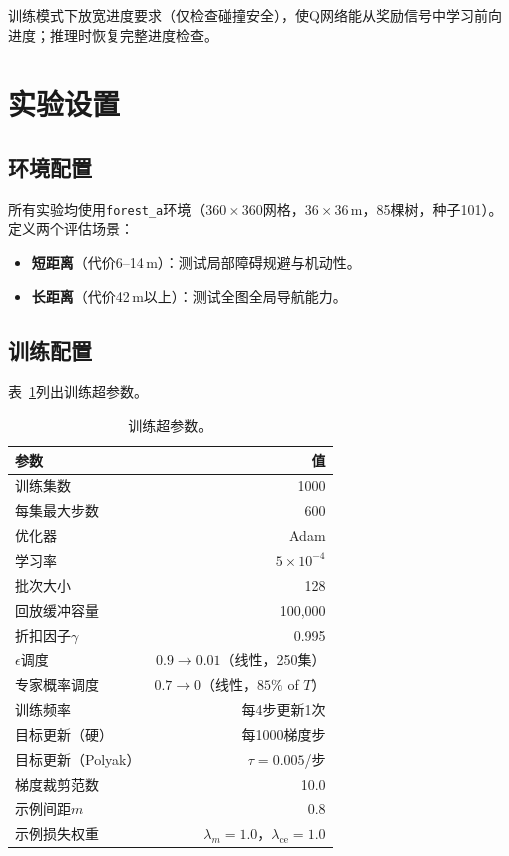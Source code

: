 \documentclass[conference]{IEEEtran}
\begin{document}
训练模式下放宽进度要求（仅检查碰撞安全），使Q网络能从奖励信号中学习前向进度；推理时恢复完整进度检查。

\section{实验设置}\label{sec:setup}

\subsection{环境配置}

所有实验均使用\texttt{forest\_a}环境（$360 \times 360$网格，$36 \times 36$\,m，85棵树，种子101）。定义两个评估场景：
\begin{itemize}
    \item \textbf{短距离}（代价6--14\,m）：测试局部障碍规避与机动性。
    \item \textbf{长距离}（代价42\,m以上）：测试全图全局导航能力。
\end{itemize}

\subsection{训练配置}

表~\ref{tab:hyperparams}列出训练超参数。

\begin{table}[t]
\centering
\caption{训练超参数。}
\label{tab:hyperparams}
\footnotesize
\begin{tabular}{@{}lr@{}}
\toprule
\textbf{参数} & \textbf{值} \\
\midrule
训练集数                   & 1000 \\
每集最大步数               & 600 \\
优化器                     & Adam \\
学习率                     & $5 \times 10^{-4}$ \\
批次大小                   & 128 \\
回放缓冲容量               & 100{,}000 \\
折扣因子$\gamma$           & 0.995 \\
$\epsilon$调度             & $0.9 \to 0.01$（线性，250集）\\
专家概率调度               & $0.7 \to 0$（线性，$85\%$ of $T$）\\
训练频率                   & 每4步更新1次 \\
目标更新（硬）             & 每1000梯度步 \\
目标更新（Polyak）         & $\tau = 0.005$/步 \\
梯度裁剪范数               & 10.0 \\
示例间距$m$                & 0.8 \\
示例损失权重               & $\lambda_m = 1.0$，$\lambda_{\text{ce}} = 1.0$ \\
\bottomrule
\end{tabular}
\end{table}
\end{document}
